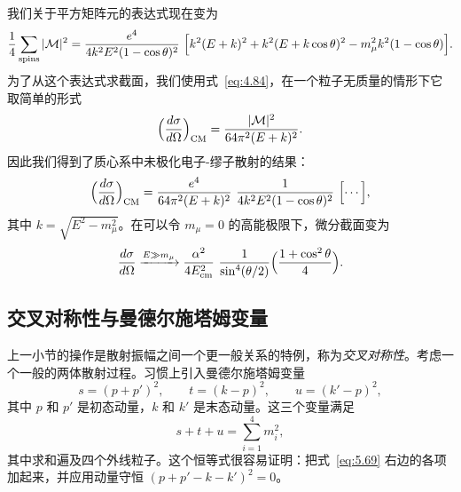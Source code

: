 我们关于平方矩阵元的表达式现在变为
\begin{equation}
  \frac{1}{4}\sum_{\text{spins}}|\mathcal{M}|^2
    = \frac{e^4}{4k^2E^2(1-\cos\theta)^2}\ \Bigl[ k^2(E+k)^2
      + k^2(E+k\cos\theta)^2 - m_\mu^2 k^2(1-\cos\theta) \Bigr] .
  \label{eq:5.62}
\end{equation}
为了从这个表达式求截面，我们使用式~\eqref{eq:4.84}，在一个粒子无质量的情形下它取简单的形式
\begin{equation}
  \Bigl( \frac{d\sigma}{d\Omega} \Bigr)_{\mathrm{CM}}
    = \frac{|\mathcal{M}|^2}{64\pi^2(E+k)^2} .
  \label{eq:5.63}
\end{equation}
因此我们得到了质心系中未极化电子-缪子散射的结果：
\begin{equation}
  \Bigl( \frac{d\sigma}{d\Omega} \Bigr)_{\mathrm{CM}}
    = \frac{e^4}{64\pi^2(E+k)^2}\ \frac{1}{4k^2E^2(1-\cos\theta)^2}\
      \Bigl[ \cdots \Bigr] ,
  \label{eq:5.64}
\end{equation}
其中 $k = \sqrt{E^2-m_\mu^2}$。在可以令 $m_\mu = 0$ 的高能极限下，微分截面变为
\begin{equation}
  \frac{d\sigma}{d\Omega} \xrightarrow{E\gg m_\mu}
    \frac{\alpha^2}{4E_{\mathrm{cm}}^2}\ \frac{1}{\sin^4(\theta/2)}
      \Bigl( \frac{1+\cos^2\theta}{4} \Bigr) .
  \label{eq:5.65}
\end{equation}

\subsection{交叉对称性与曼德尔施塔姆变量}

上一小节的操作是散射振幅之间一个更一般关系的特例，称为\emph{交叉对称性}。考虑一个一般的两体散射过程。习惯上引入曼德尔施塔姆变量
\begin{equation}
  s = (p+p')^2,\qquad t = (k-p)^2,\qquad u = (k'-p)^2 ,
  \label{eq:5.69}
\end{equation}
其中 $p$ 和 $p'$ 是初态动量，$k$ 和 $k'$ 是末态动量。这三个变量满足
\begin{equation}
  s + t + u = \sum_{i=1}^{4} m_i^2 ,
  \label{eq:5.73}
\end{equation}
其中求和遍及四个外线粒子。这个恒等式很容易证明：把式~\eqref{eq:5.69} 右边的各项加起来，并应用动量守恒 $(p+p'-k-k')^2 = 0$。


